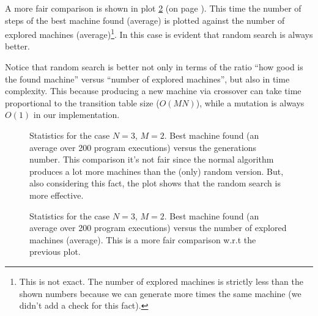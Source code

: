 \documentclass{report}
\begin{document}
A more fair comparison is shown in plot \ref{plot32good} (on page \pageref{plot32good}). This time the number of steps of the best machine found (average) is plotted against the number of explored machines (average)\footnote{This is not exact. The number of explored machines is strictly less than the shown numbers because we can generate more times the same machine (we didn't add a check for this fact).}. In this case is evident that random search is always better.

Notice that random search is better not only in terms of the ratio ``how good is the found machine'' versus ``number of explored machines'', but also in time complexity. This because producing a new machine via crossover can take time proportional to the transition table size (\ie $O(MN)$), while a mutation is always $O(1)$ in our implementation.

\begin{figure}[t]
\centering
{}
\caption[]{Statistics for the case $N=3$, $M=2$. Best machine found (an average over 200 program executions) versus the generations number. This comparison it's not fair since the normal algorithm produces a lot more machines than the (only) random version. But, also considering this fact, the plot shows that the random search is more effective.}
\label{plot32}
\end{figure}


\begin{figure}[b]
\centering
{}
\caption[]{Statistics for the case $N=3$, $M=2$. Best machine found (an average over 200 program executions) versus the number of explored machines (average). This is a more fair comparison w.r.t the previous plot.}
\label{plot32good}
\end{figure}
\end{document}
